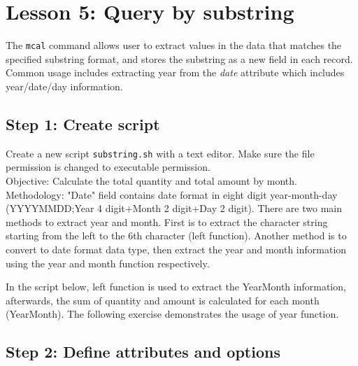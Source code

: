 

%

\section{Lesson 5: Query by substring }

The \verb|mcal| command allows user to extract values in the data that matches the specified substring format, and stores the substring as a new field in each record.  Common usage includes extracting year from the \emph{date} attribute which includes year/date/day information.


\subsection{Step 1: Create script}

Create a new script \verb|substring.sh| with a text editor. Make sure the file permission is changed to executable permission. \\

Objective: Calculate the total quantity and total amount by month.   \\

Methodology: "Date" field contains date format in eight digit year-month-day (YYYYMMDD;Year 4 digit+Month 2 digit+Day 2 digit). 
There are two main methods to extract year and month. First is to extract the character string starting from the left to the 6th character (left function). Another method is to convert to date format data type,  then extract the year and month information using the year and month function respectively. 

In the script below, left function is used to extract the YearMonth information, afterwards, the sum of quantity and amount is calculated for each month (YearMonth). 
The following exercise demonstrates  the usage of  year function. 


 \subsection{Step 2: Define attributes and options }

